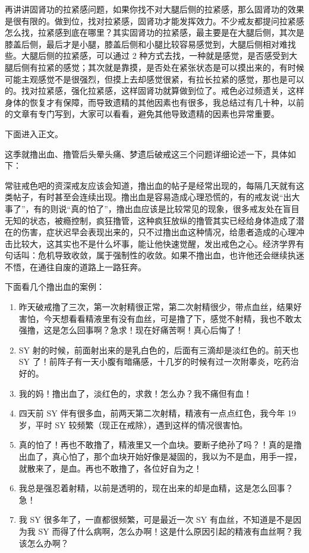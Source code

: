 \documentclass{ctexart}
\begin{document}
再讲讲固肾功的拉紧感问题，如果你找不对大腿后侧的拉紧感，那么固肾功的效果是很有限的。做到位，找对拉紧感，固肾功才能发挥效力。不少戒友都提问拉紧感怎么找，拉紧感到底在哪里？其实固肾功的拉紧感，最主要是在大腿后侧，其次是膝盖后侧，最后才是小腿，膝盖后侧和小腿比较容易感觉到，大腿后侧相对难找些。大腿后侧的拉紧感，可以通过 2 种方式去找，一种就是感觉，是否感受到大腿后侧有拉紧的感觉；其次就是靠摸，是否处在紧张状态是可以摸出来的，有时候可能主观感觉不是很强烈，但摸上去却感觉很紧，有拉长拉紧的感觉，那也是可以的。找对拉紧感，强化拉紧感，这样固肾功就算做到位了。戒色必过频遗关，这样身体的恢复才有保障，而导致遗精的其他因素也有很多，我总结过有几十种，以前的文章有专门写到，大家可以看看，避免其他导致遗精的因素也异常重要。

下面进入正文。

这季就撸出血、撸管后头晕头痛、梦遗后破戒这三个问题详细论述一下，具体如下：

常驻戒色吧的资深戒友应该会知道，撸出血的帖子是经常出现的，每隔几天就有这类帖子，有时甚至会连续出现。撸出血是容易造成心理恐慌的，有的戒友说“出大事了”，有的则说“真的怕了”，撸出血应该是比较常见的现象，很多戒友处在盲目无知的状态，被瘾控制，疯狂撸管，这种疯狂放纵的撸管其实已经给身体造成了潜在的伤害，症状迟早会表现出来的，只不过撸出血这种情况，给患者造成的心理冲击比较大，这其实也不是什么坏事，能让他快速觉醒，发出戒色之心。经济学界有句话叫：危机导致收敛，属于强制性的收敛。如果不撸出血，也许他还会继续执迷不悟，在通往自废的道路上一路狂奔。

下面看几个撸出血的案例：

\begin{enumerate}
    \item 昨天破戒撸了三次，第一次射精很正常，第二次射精很少，带点血丝，结果好害怕，今天想看看精液里有没有血丝，可是撸了下，感觉不射精，我也不敢太强撸，这是怎么回事啊？急求！现在好痛苦啊！真心后悔了！
    \item SY 射的时候，前面射出来的是乳白色的，后面有三滴却是淡红色的。前天也 SY 了！前阵子有一天小腹有暗痛感，十几岁的时候有过一次附睾炎，吃药治好的。
    \item 我的妈！撸出血了，淡红色的，求救！怎么办？我不痛但有血！
    \item 四天前 SY 伴有很多血，前两天第二次射精，精液有一点点红色，我今年 19 岁，平时 SY 较频繁（现正在戒除），遇到这样的情况很害怕。
    \item 真的怕了！再也不敢撸了，精液里又一个血块。要断子绝孙了吗？！真的是撸出血了，真心怕了，那个血块开始好像是凝固的，我以为不是血，用手一捏，就散来了，是血。再也不敢撸了，各位好自为之！
    \item 我总是强忍着射精，以前是透明的，现在出来的却是血精，这是怎么回事？急！
    \item 我 SY 很多年了，一直都很频繁，可是最近一次 SY 有血丝，不知道是不是因为我 SY 而得了什么病啊，怎么办啊！这是什么原因引起的精液有血丝啊？我该怎么办啊？
\end{enumerate}
\end{document}
